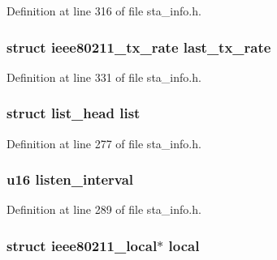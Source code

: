 Definition at line 316 of file sta\-\_\-info.\-h.

\hypertarget{structsta__info_a0691fc258d91f737d761976ad8c96118}{
\subsubsection[{last\-\_\-tx\-\_\-rate}]{\setlength{\rightskip}{0pt plus 5cm}struct ieee80211\-\_\-tx\-\_\-rate last\-\_\-tx\-\_\-rate}}\label{structsta__info_a0691fc258d91f737d761976ad8c96118}


Definition at line 331 of file sta\-\_\-info.\-h.

\hypertarget{structsta__info_a1f00f18b91d5a820f2c43064243aa86e}{
\subsubsection[{list}]{\setlength{\rightskip}{0pt plus 5cm}struct list\-\_\-head list}}\label{structsta__info_a1f00f18b91d5a820f2c43064243aa86e}


Definition at line 277 of file sta\-\_\-info.\-h.

\hypertarget{structsta__info_a778b871f4950f5c807895a3267025b6c}{
\subsubsection[{listen\-\_\-interval}]{\setlength{\rightskip}{0pt plus 5cm}u16 listen\-\_\-interval}}\label{structsta__info_a778b871f4950f5c807895a3267025b6c}


Definition at line 289 of file sta\-\_\-info.\-h.

\hypertarget{structsta__info_ad436a024f420f219c4fe2eebce7e4ab2}{
\subsubsection[{local}]{\setlength{\rightskip}{0pt plus 5cm}struct {\bf ieee80211\-\_\-local}$\ast$ local}}\label{structsta__info_ad436a024f420f219c4fe2eebce7e4ab2}



